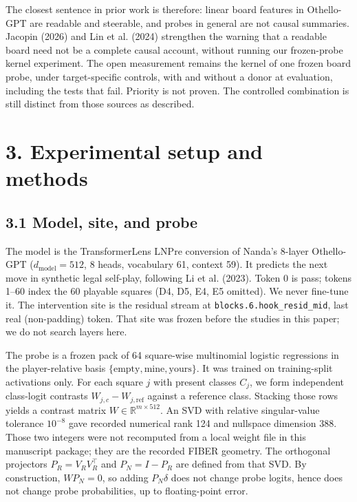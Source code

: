 \documentclass[11pt]{article}
\begin{document}
The closest sentence in prior work is therefore: linear board features in Othello-GPT are readable and steerable, and probes in general are not causal summaries. Jacopin (2026) and Lin et al. (2024) strengthen the warning that a readable board need not be a complete causal account, without running our frozen-probe kernel experiment. The open measurement remains the kernel of one frozen board probe, under target-specific controls, with and without a donor at evaluation, including the tests that fail. Priority is not proven. The controlled combination is still distinct from those sources as described.

\section{3. Experimental setup and methods}

\subsection{3.1 Model, site, and probe}

The model is the TransformerLens LNPre conversion of Nanda's 8-layer Othello-GPT (\(d_{\mathrm{model}}=512\), 8 heads, vocabulary 61, context 59). It predicts the next move in synthetic legal self-play, following Li et al. (2023). Token 0 is pass; tokens 1--60 index the 60 playable squares (D4, D5, E4, E5 omitted). We never fine-tune it. The intervention site is the residual stream at \texttt{blocks.6.hook\_resid\_mid}, last real (non-padding) token. That site was frozen before the studies in this paper; we do not search layers here.

The probe is a frozen pack of 64 square-wise multinomial logistic regressions in the player-relative basis \(\{\text{empty}, \text{mine}, \text{yours}\}\). It was trained on training-split activations only. For each square \(j\) with present classes \(C_j\), we form independent class-logit contrasts \(W_{j,c}-W_{j,\mathrm{ref}}\) against a reference class. Stacking those rows yields a contrast matrix \(W\in\mathbb{R}^{m\times 512}\). An SVD with relative singular-value tolerance \(10^{-8}\) gave recorded numerical rank 124 and nullspace dimension 388. Those two integers were not recomputed from a local weight file in this manuscript package; they are the recorded FIBER geometry. The orthogonal projectors \(P_R=V_R V_R^\top\) and \(P_N=I-P_R\) are defined from that SVD. By construction, \(W P_N=0\), so adding \(P_N\delta\) does not change probe logits, hence does not change probe probabilities, up to floating-point error.
\end{document}
